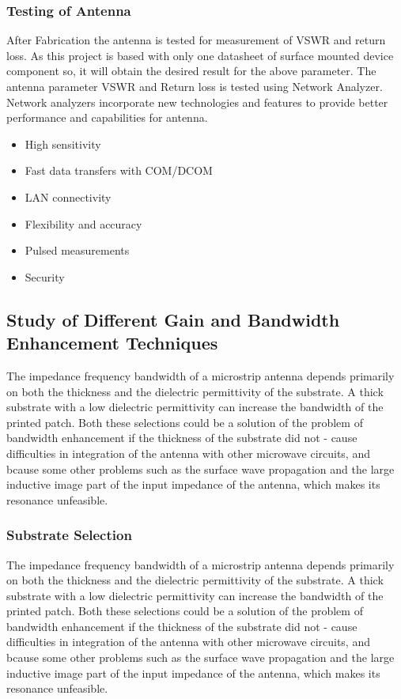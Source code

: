 \documentclass[12pt]{article}
\begin{document}
		         \subsubsection{ Testing of Antenna}
		          \justify 
		           After Fabrication the antenna is tested for measurement of VSWR and return loss. As this project is based with only one datasheet of surface mounted device component so, it will obtain the desired result for the above parameter. The antenna parameter VSWR and Return loss is tested using Network Analyzer. Network analyzers incorporate new technologies and features to provide better performance and capabilities for antenna. 
		           
		           \begin{itemize}
		           	\item High sensitivity
		           	\item Fast data transfers with COM/DCOM
		           	\item LAN connectivity
		           	\item Flexibility and accuracy
		           	\item Pulsed measurements
		           	\item Security
		           \end{itemize}
		          \cleardoublepage
		          \subsection{Study of Different Gain and Bandwidth Enhancement Techniques}
		           \justify
		            The impedance frequency bandwidth of a microstrip antenna depends primarily on both the thickness and the dielectric permittivity of the substrate. A thick substrate with a low dielectric permittivity can increase the bandwidth of the printed patch. Both these selections could be a solution of the problem of bandwidth enhancement if the thickness of the substrate did not - cause difficulties in integration of the antenna with other microwave circuits, and  bcause some other problems such as the surface wave propagation and the large inductive image part of the input impedance of the antenna, which makes its resonance unfeasible. 
			            \subsubsection{ Substrate Selection}
			             \justify
			              The impedance frequency bandwidth of a microstrip antenna depends primarily on both the thickness and the dielectric permittivity of the substrate. A thick substrate with a low dielectric permittivity can increase the bandwidth of the printed patch. Both these selections could be a solution of the problem of bandwidth enhancement if the thickness of the substrate did not - cause difficulties in integration of the antenna with other microwave circuits, and  bcause some other problems such as the surface wave propagation and the large inductive image part of the input impedance of the antenna, which makes its resonance unfeasible.\\ 
\end{document}
